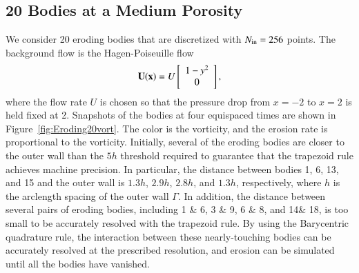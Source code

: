 \documentclass[preprint,10pt]{elsarticle}
\begin{document}
\subsection{20 Bodies at a Medium Porosity}
\label{sec:Eroding20}
We consider 20 eroding bodies that are discretized with $N_{\mathrm{in}}=256$
points.  The background flow is the Hagen-Poiseuille flow
\begin{align}
  {\mathbf{U}}({\mathbf{x}})=U \left[
  \begin{array}{c}
    1-y^2 \\ 0
  \end{array}
  \right],
\end{align}
where the flow rate $U$ is chosen so that the pressure drop from $x=-2$
to $x=2$ is held fixed at 2.  Snapshots of the bodies at four equispaced
times are shown in Figure~\ref{fig:Eroding20vort}.  The color is the
vorticity, and the erosion rate is proportional to the vorticity.
Initially, several of the eroding bodies are closer to the outer wall
than the $5h$ threshold required to guarantee that the trapezoid rule
achieves machine precision.  In particular, the distance between bodies
1, 6, 13, and 15 and the outer wall is $1.3h$, $2.9h$, $2.8h$, and
$1.3h$, respectively, where $h$ is the arclength spacing of the outer
wall $\Gamma$.  In addition, the distance between several pairs of
eroding bodies, including 1 \& 6, 3 \& 9, 6 \& 8, and 14\& 18, is too
small to be accurately resolved with the trapezoid rule.  By using the
Barycentric quadrature rule, the interaction between these
nearly-touching bodies can be accurately resolved at the prescribed
resolution, and erosion can be simulated until all the bodies have
vanished.
\end{document}
